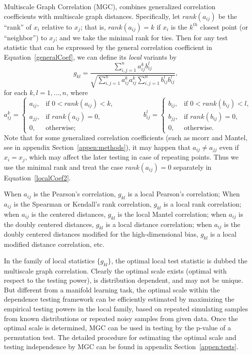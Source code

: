 \documentclass[11pt]{article}
\begin{document}
Multiscale Graph Correlation (MGC), combines generalized correlation coefficients with multiscale graph distances.  Specifically, let $rank(a_{ij})$  be the ``rank'' of $x_i$ relative to $x_j$; that is, $rank(a_{ij})=k$ if $x_i$ is the $k^{th}$ closest point (or ``neighbor'') to $x_j$; and we take the minimal rank for ties.  Then for any test statistic that can be expressed by the general correlation coefficient in Equation~\ref{generalCoef}, we can define its \emph{local} variants by
\begin{equation}
\label{localCoef}
g_{kl}=\frac{\sum_{i,j=1}^n a_{ij}^k b_{ij}^l}{\sqrt{\sum_{i,j=1}^n  a_{ij}^{k} a_{ij}^{k} \sum_{i,j=1}^n b_{ij}^{l} b_{ij}^{l}}},
\end{equation}
for each $k,l=1,\ldots,n$, where
\begin{equation}
\label{localCoef2}
    a_{ij}^k=
    \begin{cases}
      a_{ij}, & \text{if } 0 < rank(a_{ij}) < k, \\
			a_{jj}, & \text{if } rank(a_{ij}) =0, \\
      0, & \text{otherwise};
    \end{cases} \qquad \qquad
    b_{ij}^l=
    \begin{cases}
      b_{ij}, & \text{if } 0 < rank(b_{ij}) < l, \\
			b_{jj}, & \text{if } rank(b_{ij}) =0, \\
      0, & \text{otherwise}.
    \end{cases}
\end{equation}
Note that for some generalized correlation coefficients (such as mcorr and Mantel, see in appendix Section~\ref{appen:methods}), it may happen that $a_{ij} \neq a_{jj}$ even if $x_{i}=x_{j}$, which may affect the later testing in case of repeating points. Thus we use the minimal rank and treat the case $rank(a_{ij})=0$ separately in Equation~\ref{localCoef2}.

When $a_{ij}$ is the Pearson's correlation, $g_{kl}$ is a local Pearson's correlation;
When $a_{ij}$ is the Spearman or Kendall's rank correlation, $g_{kl}$ is a local rank correlation;
when $a_{ij}$ is the centered distances, $g_{kl}$ is the local Mantel correlation;
when $a_{ij}$ is the doubly centered distances, $g_{kl}$ is a local distance correlation;
when $a_{ij}$ is the doubly centered distances modified for the high-dimensional bias, $g_{kl}$ is a local modified distance correlation, etc.

In the family of local statistics $\{g_{kl}\}$, the optimal local test statistic is dubbed the multiscale graph correlation. Clearly the optimal scale exists (optimal with respect to the testing power), is distribution dependent, and may not be unique. But different from a manifold learning task, the optimal scale within the dependence testing framework can be efficiently estimated by maximizing the empirical testing powers in the local family, based on repeated simulating samples from known distributions or repeated noisy samples from given data. Once the optimal scale is determined, MGC can be used in testing by the p-value of a permutation test. The detailed procedure for estimating the optimal scale and testing independence by MGC can be found in appendix Section~\ref{appen:tests}.
\end{document}
